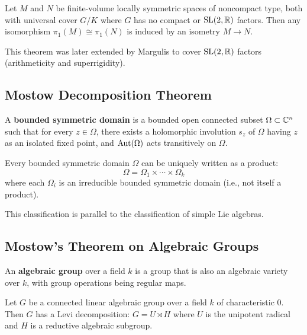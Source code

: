 \begin{theorem}
Let $M$ and $N$ be finite-volume locally symmetric spaces of noncompact type, both with universal cover $G/K$ where $G$ has no compact or $\operatorname{SL}(2,\mathbb{R})$ factors. Then any isomorphism $\pi_1(M) \cong \pi_1(N)$ is induced by an isometry $M \to N$.
\end{theorem}

This theorem was later extended by Margulis to cover $\operatorname{SL}(2,\mathbb{R})$ factors (arithmeticity and superrigidity).

\subsection{Mostow Decomposition Theorem}

\begin{definition}
A \textbf{bounded symmetric domain} is a bounded open connected subset $\Omega \subset \mathbb{C}^n$ such that for every $z \in \Omega$, there exists a holomorphic involution $s_z$ of $\Omega$ having $z$ as an isolated fixed point, and $\operatorname{Aut}(\Omega)$ acts transitively on $\Omega$.
\end{definition}

\begin{theorem}
Every bounded symmetric domain $\Omega$ can be uniquely written as a product:
\[
\Omega = \Omega_1 \times \cdots \times \Omega_k
\]
where each $\Omega_i$ is an irreducible bounded symmetric domain (i.e., not itself a product).
\end{theorem}

This classification is parallel to the classification of simple Lie algebras.

\subsection{Mostow's Theorem on Algebraic Groups}

\begin{definition}
An \textbf{algebraic group} over a field $k$ is a group that is also an algebraic variety over $k$, with group operations being regular maps.
\end{definition}

\begin{theorem}[Mostow, 1956]
Let $G$ be a connected linear algebraic group over a field $k$ of characteristic 0. Then $G$ has a Levi decomposition: $G = U \rtimes H$ where $U$ is the unipotent radical and $H$ is a reductive algebraic subgroup.
\end{theorem}

